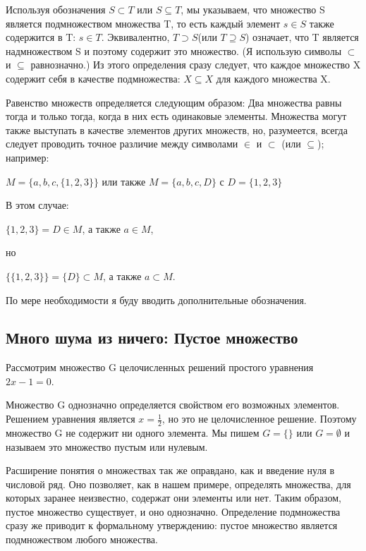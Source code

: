 Используя обозначения \(S \subset T\) или \(S \subseteq T\), мы указываем, что множество S является подмножеством множества T, то есть каждый элемент \(s \in S\) также содержится в T: \(s \in T\). Эквивалентно, \(T \supset S\)(или \(T \supseteq S\)) означает, что T является надмножеством S и поэтому содержит это множество. (Я использую символы \(\subset\) и \(\subseteq\) равнозначно.) Из этого определения сразу следует, что каждое множество X содержит себя в качестве подмножества: \(X \subseteq X\) для каждого множества X.

Равенство множеств определяется следующим образом: Два множества равны тогда и только тогда, когда в них есть одинаковые элементы. Множества могут также выступать в качестве элементов других множеств, но, разумеется, всегда следует проводить точное различие между символами \(\in\) и \(\subset\) (или \(\subseteq\)); например:

\vspace{0.5cm}
\(M = \{a,b,c,\{1,2,3\}\}\) или также \(M = \{a,b,c,D\}\) с \(D=\{1,2,3\}\)
\vspace{0.5cm}

В этом случае:

\vspace{0.5cm}
\(\{1,2,3\}=D \in M\), а также \(a \in M\),

но

\(\{\{1,2,3\}\}=\{D\} \subset M\), а также \(a \subset M\).
\vspace{0.5cm}

По мере необходимости я буду вводить дополнительные обозначения.

\subsection{Много шума из ничего: Пустое множество}
Рассмотрим множество G целочисленных решений простого уравнения \(2x-1=0\).

Множество G однозначно определяется свойством его возможных элементов.
Решением уравнения является \(x=\frac{1}{2}\), но это не целочисленное решение.
Поэтому множество G не содержит ни одного элемента. Мы пишем \(G=\{\}\) или \(G=\emptyset\) и называем это множество пустым или нулевым.

Расширение понятия о множествах так же оправдано, как и введение нуля в числовой ряд.
Оно позволяет, как в нашем примере, определять множества, для которых заранее неизвестно, содержат они элементы или нет.
Таким образом, пустое множество существует, и оно однозначно.
Определение подмножества сразу же приводит к формальному утверждению: пустое множество является подмножеством любого множества.

